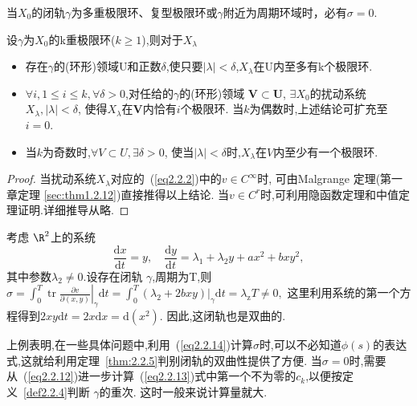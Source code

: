 \begin{corollary}
  \label{colory 2.6}
  当$X_{0}$的闭轨$\gamma$为多重极限环、复型极限环或$\gamma$附近为周期环域时，必有$\sigma=0$.
\end{corollary}

\begin{theorem}
  \label{thm2.7}
  设$\gamma$为$X_{0}$的k重极限环($k \geqslant 1$),则对于$X_{\lambda}$
  \begin{itemize}
\item 存在$\gamma$的(环形)领域U和正数$\delta$,使只要$|\lambda|<\delta$,$X_{\lambda}$在U内至多有k个极限环.
\item $\forall i, 1 \leqslant i \leqslant k, \forall \delta>0$,对任给的$\gamma$的(环形)领域 $\boldsymbol{V} \subset \boldsymbol{U}$,
  $\exists X_{0}$的扰动系统$X_{\lambda},|\lambda|<\delta$,
  使得$X_{\lambda}$在$ \boldsymbol{V} $内恰有$i$个极限环.
  当$k$为偶数时,上述结论可扩充至$i=0$.
\item 当$k$为奇数时,$\forall V \subset U, \exists \delta>0$,
  使当$|\lambda|<\delta$时,$X_{\lambda}$在$V$内至少有一个极限环.
\end{itemize}
\end{theorem}

\begin{proof}
  当扰动系统$X_{\lambda}$对应的~(\ref{eq2.2.2})中的$v \in C^{\infty}$时,
  可由Malgrange 定理(第一章定理 \ref{sec:thm1.2.12})直接推得以上结论.
  当$v \in C^{r}$时,可利用隐函数定理和中值定理证明.详细推导从略.
\end{proof}

\begin{example}
  \label{exam:2.8}
  考虑 $\R^{2}$上的系统
  $$\frac{\mathrm{d} x}{\mathrm{d} t}=y, \quad \frac{\mathrm{d} y}{\mathrm{d} t}=\lambda_{1}+\lambda_{2} y+a x^{2}+b x y^{2},$$
  其中参数$\lambda_{2} \neq 0$.设存在闭轨 $\gamma$,周期为T,则
  $\sigma=\int_{0}^{T} \operatorname{tr}\left.\frac{\partial v}{\partial(x, y)}\right|_{\gamma} \mathrm{d} t=\int_{0}^{T}\left.\left(\lambda_{2}+2 b x y\right)\right|_{\gamma} \mathrm{d} t=\lambda_{\mathrm{z}} T \neq 0,$
  这里利用系统的第一个方程得到$2 x y \mathrm{d} t=2 x \mathrm{d} x=\mathrm{d}\left(x^{2}\right)$.
  因此,这闭轨也是双曲的.
\end{example}

\begin{corollary}
  \label{corollary:2.9}
  上例表明,在一些具体问题中,利用~(\ref{eq2.2.14})计算$\sigma$时,可以不必知道$\phi(s)$的表达式,这就给利用定理~\ref{thm:2.2.5}判别闭轨的双曲性提供了方便.
  当$\sigma=0$时,需要从~(\ref{eq2.2.12})进一步计算~(\ref{eq2.2.13})式中第一个不为零的$c_k$,以便按定义~\ref{def2.2.4}判断 $\gamma$的重次.
  这时一般来说计算量就大.
\end{corollary}